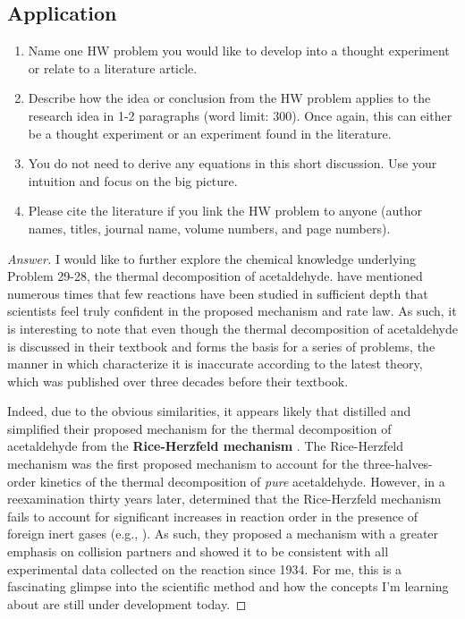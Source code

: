 \documentclass[../psets.tex]{subfiles}
\begin{document}
\subsection*{Application}
\begin{enumerate}[label={\arabic*)}]
    \item Name one HW problem you would like to develop into a thought experiment or relate to a literature article.
    \item Describe how the idea or conclusion from the HW problem applies to the research idea in 1-2 paragraphs (word limit: 300). Once again, this can either be a thought experiment or an experiment found in the literature.
    \item You do not need to derive any equations in this short discussion. Use your intuition and focus on the big picture.
    \item Please cite the literature if you link the HW problem to anyone (author names, titles, journal name, volume numbers, and page numbers).
\end{enumerate}
\begin{proof}[Answer]


    I would like to further explore the chemical knowledge underlying Problem 29-28, the thermal decomposition of acetaldehyde. \textcite{bib:McQuarrieSimon} have mentioned numerous times that few reactions have been studied in sufficient depth that scientists feel truly confident in the proposed mechanism and rate law. As such, it is interesting to note that even though the thermal decomposition of acetaldehyde is discussed in their textbook and forms the basis for a series of problems, the manner in which \textcite{bib:McQuarrieSimon} characterize it is inaccurate according to the latest theory, which was published over three decades before their textbook.\par
    Indeed, due to the obvious similarities, it appears likely that \textcite{bib:McQuarrieSimon} distilled and simplified their proposed mechanism for the thermal decomposition of acetaldehyde from the \textbf{Rice-Herzfeld mechanism} \parencite[288]{bib:RiceHerzfeld}. The Rice-Herzfeld mechanism was the first proposed mechanism to account for the three-halves-order kinetics of the thermal decomposition of \emph{pure} acetaldehyde. However, in a reexamination thirty years later, \textcite{bib:EusufLaidler} determined that the Rice-Herzfeld mechanism fails to account for significant increases in reaction order in the presence of foreign inert gases (e.g., ). As such, they proposed a mechanism with a greater emphasis on collision partners and showed it to be consistent with all experimental data collected on the reaction since 1934. For me, this is a fascinating glimpse into the scientific method and how the concepts I'm learning about are still under development today.
\end{proof}


\end{document}
